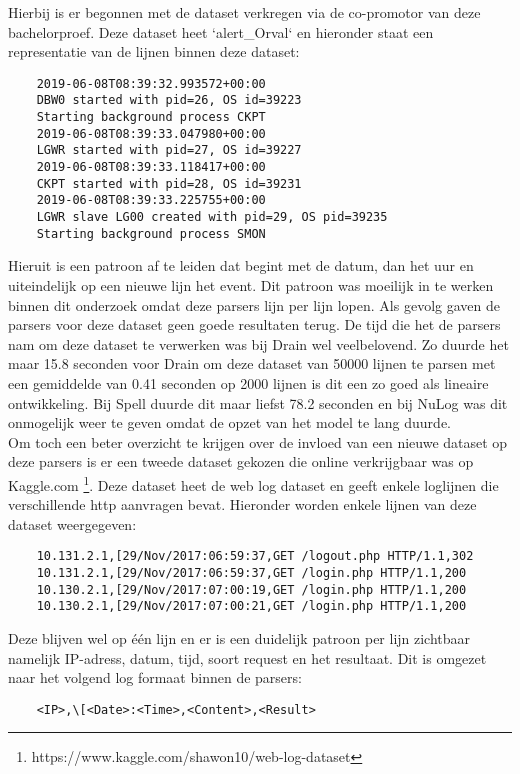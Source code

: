 Hierbij is er begonnen met de dataset verkregen via de co-promotor van deze bachelorproef. Deze dataset heet `alert\_Orval` en hieronder staat een representatie van de lijnen binnen deze dataset:
\begin{verbatim}
    2019-06-08T08:39:32.993572+00:00
    DBW0 started with pid=26, OS id=39223 
    Starting background process CKPT
    2019-06-08T08:39:33.047980+00:00
    LGWR started with pid=27, OS id=39227 
    2019-06-08T08:39:33.118417+00:00
    CKPT started with pid=28, OS id=39231 
    2019-06-08T08:39:33.225755+00:00
    LGWR slave LG00 created with pid=29, OS pid=39235
    Starting background process SMON
\end{verbatim}
Hieruit is een patroon af te leiden dat begint met de datum, dan het uur en uiteindelijk op een nieuwe lijn het event. Dit patroon was moeilijk in te werken binnen dit onderzoek omdat deze parsers lijn per lijn lopen. Als gevolg gaven de parsers voor deze dataset geen goede resultaten terug. De tijd die het de parsers nam om deze dataset te verwerken was bij Drain wel veelbelovend. Zo duurde het maar 15.8 seconden voor Drain om deze dataset van 50000 lijnen te parsen met een gemiddelde van 0.41 seconden op 2000 lijnen is dit een zo goed als lineaire ontwikkeling. Bij Spell duurde dit maar liefst 78.2 seconden en bij NuLog was dit onmogelijk weer te geven omdat de opzet van het model te lang duurde.\\

Om toch een beter overzicht te krijgen over de invloed van een nieuwe dataset op deze parsers is er een tweede dataset gekozen die online verkrijgbaar was op Kaggle.com \footnote{https://www.kaggle.com/shawon10/web-log-dataset}. Deze dataset heet de web log dataset en geeft enkele loglijnen die verschillende http aanvragen bevat. Hieronder worden enkele lijnen van deze dataset weergegeven:
\begin{verbatim}
    10.131.2.1,[29/Nov/2017:06:59:37,GET /logout.php HTTP/1.1,302
    10.131.2.1,[29/Nov/2017:06:59:37,GET /login.php HTTP/1.1,200
    10.130.2.1,[29/Nov/2017:07:00:19,GET /login.php HTTP/1.1,200
    10.130.2.1,[29/Nov/2017:07:00:21,GET /login.php HTTP/1.1,200
\end{verbatim}
Deze blijven wel op één lijn en er is een duidelijk patroon per lijn zichtbaar namelijk IP-adress, datum, tijd, soort request en het resultaat. Dit is omgezet naar het volgend log formaat binnen de parsers:
\begin{verbatim}
    <IP>,\[<Date>:<Time>,<Content>,<Result>
\end{verbatim}

